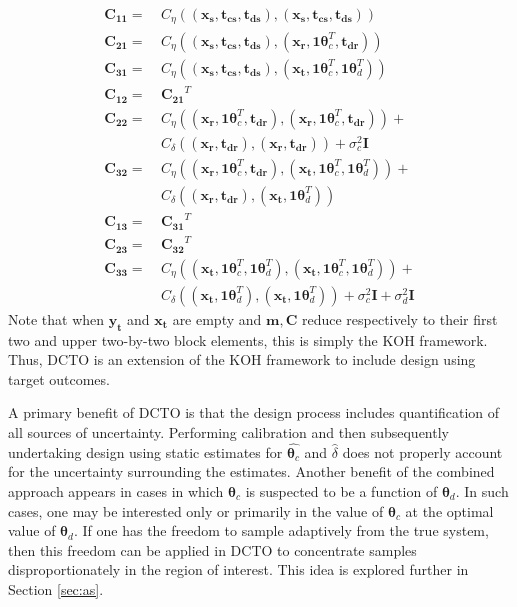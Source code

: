 \documentclass[twocolumn,10pt]{asme2ej}
\begin{document}
\begin{align*}
\mathbf{C_{11}}=&\ C_\eta\left((\mathbf{x_s},\mathbf{t_{cs}},\mathbf{t_{ds}}),(\mathbf{x_s},\mathbf{t_{cs}},\mathbf{t_{ds}})\right)\\
\mathbf{C_{21}}=&\ C_\eta\left((\mathbf{x_s},\mathbf{t_{cs}},\mathbf{t_{ds}}),(\mathbf{x_r},\mathbf1\boldsymbol\theta_c^T,\mathbf{t_{dr}})\right)\\
\mathbf{C_{31}}=&\ C_\eta\left((\mathbf{x_s},\mathbf{t_{cs}},\mathbf{t_{ds}}),(\mathbf{x_t},\mathbf1\boldsymbol\theta_c^T,\mathbf1\boldsymbol\theta_d^T)\right)\\
\mathbf{C_{12}}=&\ \mathbf{C_{21}}^T\\
\mathbf{C_{22}}=&\ C_\eta\left((\mathbf{x_r},\mathbf1\boldsymbol\theta_c^T,\mathbf{t_{dr}}),(\mathbf{x_r},\mathbf1\boldsymbol\theta_c^T,\mathbf{t_{dr}})\right) + \\
&\ C_\delta\left( (\mathbf{x_r},\mathbf{t_{dr}}),(\mathbf{x_r},\mathbf{t_{dr}}) \right) + \sigma^2_c \mathbf I\\
\mathbf{C_{32}}=&\ C_\eta\left((\mathbf{x_r},\mathbf1\boldsymbol\theta_c^T,\mathbf{t_{dr}}),(\mathbf{x_t},\mathbf1\boldsymbol\theta_c^T,\mathbf1\boldsymbol\theta_d^T)\right) + \\
&\ C_\delta\left( (\mathbf{x_r},\mathbf{t_{dr}}),(\mathbf{x_t},\mathbf1\boldsymbol\theta_d^T) \right)\\
\mathbf{C_{13}}=&\ \mathbf{C_{31}}^T\\
\mathbf{C_{23}}=&\ \mathbf{C_{32}}^T\\
\mathbf{C_{33}}=&\ C_\eta\left((\mathbf{x_t},\mathbf1\boldsymbol\theta_c^T,\mathbf1\boldsymbol\theta_d^T),(\mathbf{x_t},\mathbf1\boldsymbol\theta_c^T,\mathbf1\boldsymbol\theta_d^T)\right) + \\
&\ C_\delta\left( (\mathbf{x_t},\mathbf1\boldsymbol\theta_d^T),(\mathbf{x_t},\mathbf1\boldsymbol\theta_d^T) \right) + \sigma^2_c\mathbf I + \sigma^2_d \mathbf I
\end{align*}
%
Note that when $\mathbf{y_t}$ and $\mathbf{x_t}$ are empty and $\mathbf m, \mathbf C$ reduce respectively to their first two and upper two-by-two block elements, this is simply the KOH framework.
%
Thus, DCTO is an extension of the KOH framework to include design using target outcomes.
%

%
A primary benefit of DCTO is that the design process includes quantification of all sources of uncertainty.
%
Performing calibration and then subsequently undertaking design using static estimates for $\widehat{\boldsymbol\theta_c}$ and $\widehat \delta$ does not properly account for the uncertainty surrounding the estimates. 
%
Another benefit of the combined approach appears in cases in which $\boldsymbol\theta_c$ is suspected to be a function of $\boldsymbol\theta_d$.
%
In such cases, one may be interested only or primarily in the value of $\boldsymbol\theta_c$ at the optimal value of $\boldsymbol\theta_d$.
%
If one has the freedom to sample adaptively from the true system, then this freedom can be applied in DCTO to concentrate samples disproportionately in the region of interest.
%
This idea is explored further in Section \ref{sec:as}.
%
\end{document}
